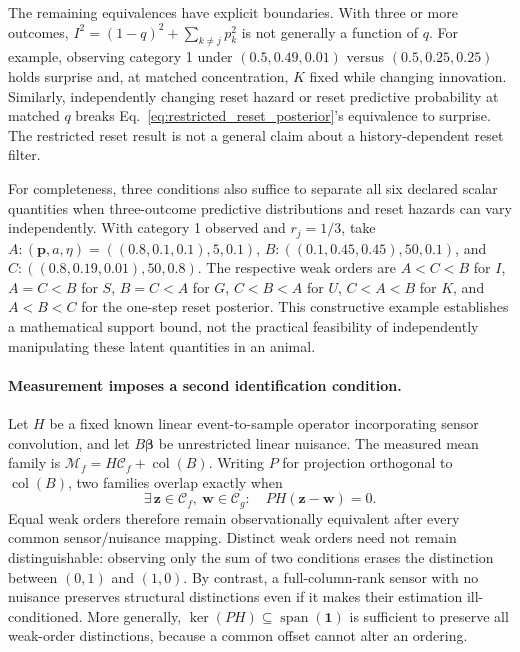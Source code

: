The remaining equivalences have explicit boundaries. With three or more
outcomes, $I^2=(1-q)^2+\sum_{k\ne j}p_k^2$ is not generally a function of $q$.
For example, observing category 1 under $(0.5,0.49,0.01)$ versus
$(0.5,0.25,0.25)$ holds surprise and, at matched concentration, $K$ fixed while
changing innovation. Similarly, independently changing reset hazard or reset
predictive probability at matched $q$ breaks
Eq.~\ref{eq:restricted_reset_posterior}'s equivalence to surprise. The restricted
reset result is not a general claim about a history-dependent reset filter.

For completeness, three conditions also suffice to separate all six declared
scalar quantities when three-outcome predictive distributions and reset hazards
can vary independently. With category 1 observed and $r_j=1/3$, take
$A:(\mathbf p,a,\eta)=((0.8,0.1,0.1),5,0.1)$,
$B:((0.1,0.45,0.45),50,0.1)$, and
$C:((0.8,0.19,0.01),50,0.8)$. The respective weak orders are
$A<C<B$ for $I$, $A=C<B$ for $S$, $B=C<A$ for $G$, $C<B<A$ for $U$,
$C<A<B$ for $K$, and $A<B<C$ for the one-step reset posterior. This constructive
example establishes a mathematical support bound, not the practical feasibility
of independently manipulating these latent quantities in an animal.

\paragraph{Measurement imposes a second identification condition.}
Let $H$ be a fixed known linear event-to-sample operator incorporating sensor
convolution, and let $B\boldsymbol\beta$ be unrestricted linear nuisance.
The measured mean family is
$\mathcal M_f=H\mathcal C_f+\operatorname{col}(B)$.
Writing $P$ for projection orthogonal to $\operatorname{col}(B)$, two families
overlap exactly when
\begin{equation}
\exists\,\mathbf z\in\mathcal C_f,\ \mathbf w\in\mathcal C_g:
\quad PH(\mathbf z-\mathbf w)=0.
\label{eq:measured_identification}
\end{equation}
Equal weak orders therefore remain observationally equivalent after every common
sensor/nuisance mapping. Distinct weak orders need not remain distinguishable:
observing only the sum of two conditions erases the distinction between
$(0,1)$ and $(1,0)$. By contrast, a full-column-rank sensor with no nuisance
preserves structural distinctions even if it makes their estimation
ill-conditioned. More generally, $\ker(PH)\subseteq\operatorname{span}(\mathbf1)$
is sufficient to preserve all weak-order distinctions, because a common offset
cannot alter an ordering.

